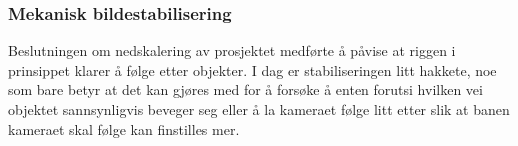 \subsubsection{Mekanisk bildestabilisering}
Beslutningen om nedskalering av prosjektet medførte å påvise at riggen i prinsippet klarer å følge etter objekter. I dag er stabiliseringen litt hakkete, noe som bare betyr at det kan gjøres med for å forsøke å enten forutsi hvilken vei objektet sannsynligvis beveger seg eller å la kameraet følge litt etter slik at banen kameraet skal følge kan finstilles mer.



